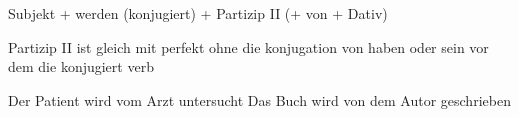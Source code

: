 Subjekt + werden (konjugiert) + Partizip II (+ von + Dativ)

Partizip II ist gleich mit perfekt ohne die konjugation von haben oder sein vor dem die konjugiert verb

Der Patient wird vom Arzt untersucht
Das Buch wird von dem Autor geschrieben


